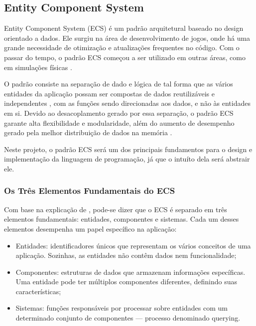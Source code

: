 
\subsection{Entity Component System}

Entity Component System (ECS) é um padrão arquitetural baseado no design orientado a dados. Ele surgiu na área de desenvolvimento de jogos, onde há uma grande necessidade de otimização e atualizações frequentes no código. Com o passar do tempo, o padrão ECS começou a ser utilizado em outras áreas, como em simulações físicas \cite{flightdynamics}.

O padrão consiste na separação de dado e lógica de tal forma que as vários entidades da aplicação possam ser compostas de dados reutilizáveis e independentes \cite{ecsfaq}, com as funções sendo direcionadas aos dados, e não às entidades em si. Devido ao desacoplamento gerado por essa separação, o padrão ECS garante alta flexibilidade e modularidade, além do aumento de desempenho gerado pela melhor distribuição de dados na memória \cite{ecsstorageinpics}.

Neste projeto, o padrão ECS será um dos principais fundamentos para o design e implementação da linguagem de programação, já que o intuíto dela será abstrair ele.

\subsubsection{Os Três Elementos Fundamentais do ECS}

Com base na explicação de \textcite{ecsfaq}, pode-se dizer que o ECS é separado em três elementos fundamentais: entidades, componentes e sistemas. Cada um desses elementos desempenha um papel específico na aplicação:

\begin{itemize}
    \item Entidades: identificadores únicos que representam os vários conceitos de uma aplicação. Sozinhas, as entidades não contêm dados nem funcionalidade;
    \item Componentes: estruturas de dados que armazenam informações específicas. Uma entidade pode ter múltiplos componentes diferentes, definindo suas características;
    \item Sistemas: funções responsáveis por processar sobre entidades com um determinado conjunto de componentes — processo denominado querying.
\end{itemize}

